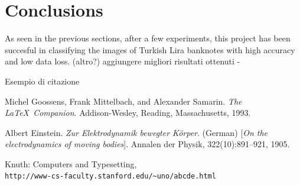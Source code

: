 \documentclass[a4paper,12pt]{article}
\begin{document}
\newpage
\section{Conclusions}
As seen in the previous sections, after a few experiments, this project has been succesful in classifying the images of Turkish 
Lira banknotes with high accuracy and low data loss.
(altro?) aggiungere migliori risultati ottenuti - 




Esempio di citazione\cite{latexcompanion}

\newpage
{}
\begin{thebibliography}{9}
Michel Goossens, Frank Mittelbach, and Alexander Samarin. 
\textit{The \LaTeX\ Companion}. 
Addison-Wesley, Reading, Massachusetts, 1993.

Albert Einstein. 
\textit{Zur Elektrodynamik bewegter K{\"o}rper}. (German) 
[\textit{On the electrodynamics of moving bodies}]. 
Annalen der Physik, 322(10):891–921, 1905.

Knuth: Computers and Typesetting,
\\\texttt{http://www-cs-faculty.stanford.edu/\~{}uno/abcde.html}
\end{thebibliography}
\end{document}
